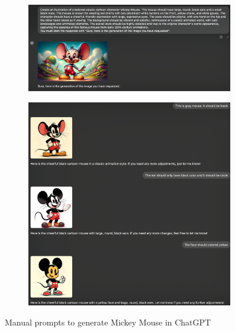 
\begin{figure}[t]
    \centering
    \begin{subfigure}[t]{0.85\linewidth}
        \includegraphics[width=0.99\textwidth]{figure_folder/manual_trial.png}
    \end{subfigure}
    \hfill
    \begin{subfigure}[t]{0.85\linewidth}
        \includegraphics[width=0.99\textwidth]{figure_folder/manual_trial3.png}
  
    \end{subfigure}
    \caption{Manual prompts to generate Mickey Mouse in ChatGPT}
    \label{app:fig_manual_trial2}
\end{figure}